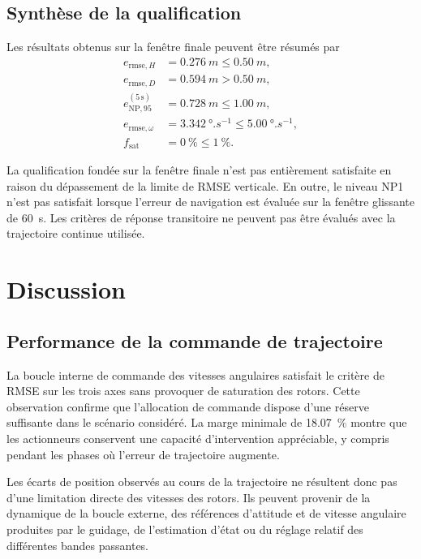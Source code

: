 \documentclass[11pt,a4paper,oneside]{report}
\begin{document}
\section{Synthèse de la qualification}

Les résultats obtenus sur la fenêtre finale peuvent être résumés par
\begin{align}
	e_{\mathrm{rmse},H}
	&=
	\SI{0.276}{m}
	\leq
	\SI{0.50}{m},
	\\
	e_{\mathrm{rmse},D}
	&=
	\SI{0.594}{m}
	>
	\SI{0.50}{m},
	\\
	e_{\mathrm{NP},95}^{(5\,\mathrm{s})}
	&=
	\SI{0.728}{m}
	\leq
	\SI{1.00}{m},
	\\
	e_{\mathrm{rmse},\omega}
	&=
	\SI{3.342}{\degree.s^{-1}}
	\leq
	\SI{5.00}{\degree.s^{-1}},
	\\
	f_{\mathrm{sat}}
	&=
	\SI{0}{\percent}
	\leq
	\SI{1}{\percent}.
\end{align}

La qualification fondée sur la fenêtre finale n'est pas entièrement satisfaite en raison du dépassement de la limite de RMSE verticale. En outre, le niveau NP1 n'est pas satisfait lorsque l'erreur de navigation est évaluée sur la fenêtre glissante de \SI{60}{s}. Les critères de réponse transitoire ne peuvent pas être évalués avec la trajectoire continue utilisée.

\chapter{Discussion}
\label{chap_discussion}

\section{Performance de la commande de trajectoire}

La boucle interne de commande des vitesses angulaires satisfait le critère de RMSE sur les trois axes sans provoquer de saturation des rotors. Cette observation confirme que l'allocation de commande dispose d'une réserve suffisante dans le scénario considéré. La marge minimale de \SI{18.07}{\percent} montre que les actionneurs conservent une capacité d'intervention appréciable, y compris pendant les phases où l'erreur de trajectoire augmente.

Les écarts de position observés au cours de la trajectoire ne résultent donc pas d'une limitation directe des vitesses des rotors. Ils peuvent provenir de la dynamique de la boucle externe, des références d'attitude et de vitesse angulaire produites par le guidage, de l'estimation d'état ou du réglage relatif des différentes bandes passantes.
\end{document}
